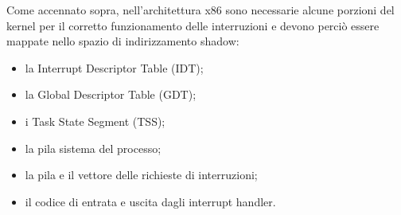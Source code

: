 Come accennato sopra, nell'architettura x86 sono necessarie alcune porzioni del kernel per il corretto funzionamento delle interruzioni e devono perciò essere mappate nello spazio di indirizzamento shadow:
\begin{itemize}
	\item la Interrupt Descriptor Table (IDT);
	\item la Global Descriptor Table (GDT);
	\item i Task State Segment (TSS);
	\item la pila sistema del processo;
	\item la pila e il vettore delle richieste di interruzioni;
	\item il codice di entrata e uscita dagli interrupt handler.
\end{itemize}
